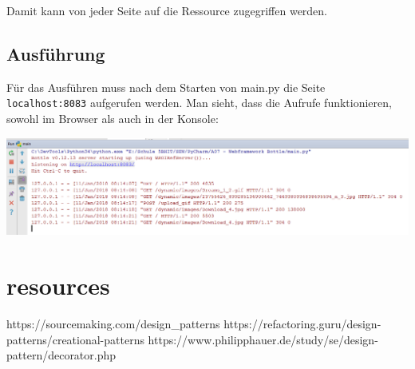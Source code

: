 Damit kann von jeder Seite auf die Ressource zugegriffen werden.

\subsection{Ausführung}
Für das Ausführen muss nach dem Starten von main.py die Seite \verb|localhost:8083| aufgerufen werden. Man sieht, dass die Aufrufe funktionieren, sowohl im Browser als auch in der Konsole:

\begin{center}
	\includegraphics[width=1.0\linewidth]{images/a2.png}
\end{center}





\clearpage
\section{resources}
https://sourcemaking.com/design\_patterns
https://refactoring.guru/design-patterns/creational-patterns
https://www.philipphauer.de/study/se/design-pattern/decorator.php

